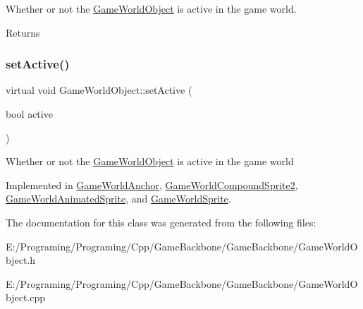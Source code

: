 Whether or not the \hyperlink{class_game_world_object}{Game\+World\+Object} is active in the game world. 

\begin{DoxyReturn}{Returns}

\end{DoxyReturn}
\mbox{\label{class_game_world_object_a79d89ff68b9334b454300cf855719b77}} 
\subsubsection{\texorpdfstring{set\+Active()}{setActive()}}
{\footnotesize\ttfamily virtual void Game\+World\+Object\+::set\+Active (\begin{DoxyParamCaption}\item[{bool}]{active }\end{DoxyParamCaption})\hspace{0.3cm}{\ttfamily [pure virtual]}}



Whether or not the \hyperlink{class_game_world_object}{Game\+World\+Object} is active in the game world



Implemented in \hyperlink{class_game_world_anchor_accfec567c6edaa530ef6f5d5b5489d6b}{Game\+World\+Anchor}, \hyperlink{class_game_world_compound_sprite2_a773426feff97b69af22941f84a7ee40c}{Game\+World\+Compound\+Sprite2}, \hyperlink{class_game_world_animated_sprite_a625b0d3876fbac51995bf048e94fd7e5}{Game\+World\+Animated\+Sprite}, and \hyperlink{class_game_world_sprite_a4b8597b947076f847d20c66be7db8847}{Game\+World\+Sprite}.



The documentation for this class was generated from the following files\+:\begin{DoxyCompactItemize}
\item 
E\+:/\+Programing/\+Programing/\+Cpp/\+Game\+Backbone/\+Game\+Backbone/Game\+World\+Object.\+h\item 
E\+:/\+Programing/\+Programing/\+Cpp/\+Game\+Backbone/\+Game\+Backbone/Game\+World\+Object.\+cpp\end{DoxyCompactItemize}
